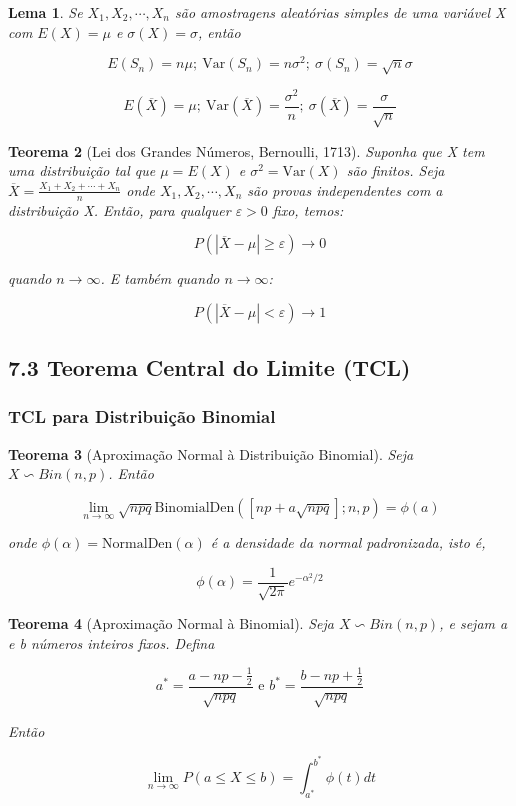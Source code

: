 \documentclass[12pt]{article}
\newtheorem{theorem}{Teorema}[section]
\newtheorem{lemma}[theorem]{Lema}
\begin{document}
\begin{lemma}
Se $X_1, X_2, \cdots, X_n$ são amostragens aleatórias simples de uma variável X com $E(X) = \mu$ e $\sigma(X) = \sigma$, então

$$E(S_n) = n \mu; \ \text{Var}(S_n) = n \sigma^2; \ \sigma(S_n) = \sqrt{n} \sigma$$

$$E(\overline{X}) = \mu; \ \text{Var}(\overline{X}) = \frac{\sigma^2}{n}; \ \sigma(\overline{X}) = \frac{\sigma}{\sqrt{n}}$$
\end{lemma}

\begin{theorem}[Lei dos Grandes Números, Bernoulli, 1713]
Suponha que X tem uma distribuição tal que $\mu = E(X)$ e $\sigma^2 = \text{Var}(X)$ são finitos. Seja $\overline{X} = \frac{X_1 + X_2 + \cdots + X_n}{n}$ onde $X_1, X_2, \cdots, X_n$ são provas independentes com a distribuição X. Então, para qualquer $\varepsilon > 0$ fixo, temos:

$$P(|\overline{X} - \mu| \geq \varepsilon) \rightarrow 0$$

quando $n \rightarrow \infty$. E também quando $n \rightarrow \infty$:

$$P(|\overline{X} - \mu| < \varepsilon) \rightarrow 1$$

\end{theorem}

\subsection*{7.3 Teorema Central do Limite (TCL)}
\label{s33}

\subsubsection*{TCL para Distribuição Binomial}
\begin{theorem}[Aproximação Normal à Distribuição Binomial]
Seja $X \backsim Bin(n, p)$. Então

$$\lim_{n \rightarrow \infty} \sqrt{n p q} \text{BinomialDen}([np + a \sqrt{n p q} ]; n, p) = \phi(a)$$

onde $\phi(\alpha) = \text{NormalDen}(\alpha)$ é a densidade da normal padronizada, isto é,

$$\phi(\alpha) = \frac{1}{\sqrt{2 \pi}}e^{-\alpha^2/2}$$
\end{theorem}

\begin{theorem}[Aproximação Normal à Binomial]
Seja $X \backsim Bin(n, p)$, e sejam a e b números inteiros fixos. Defina

$$a^* = \frac{a - n p - \frac{1}{2}}{\sqrt{n p q}} \text{ e } b^* = \frac{b - n p + \frac{1}{2}}{\sqrt{n p q}}$$

Então

$$\lim_{n \rightarrow \infty} P(a \leq X \leq b) = \int_{a^*}^{b^*}\phi(t) d t$$
\end{theorem}
\end{document}
